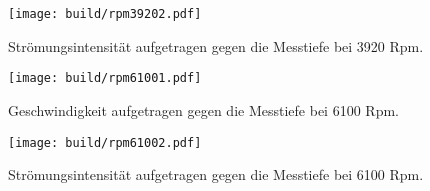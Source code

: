 \begin{figure}
     \centering
     \texttt{[image: build/rpm39202.pdf]}
     \caption{Strömungsintensität aufgetragen gegen die Messtiefe bei 3920 Rpm.}
     \label{fig:39202}
\end{figure}

\begin{figure}
     \centering
     \texttt{[image: build/rpm61001.pdf]}
     \caption{Geschwindigkeit aufgetragen gegen die Messtiefe bei 6100 Rpm.}
     \label{fig:61001}
\end{figure}

\begin{figure}
     \centering
     \texttt{[image: build/rpm61002.pdf]}
     \caption{Strömungsintensität aufgetragen gegen die Messtiefe bei 6100 Rpm.}
     \label{fig:61002}
\end{figure}